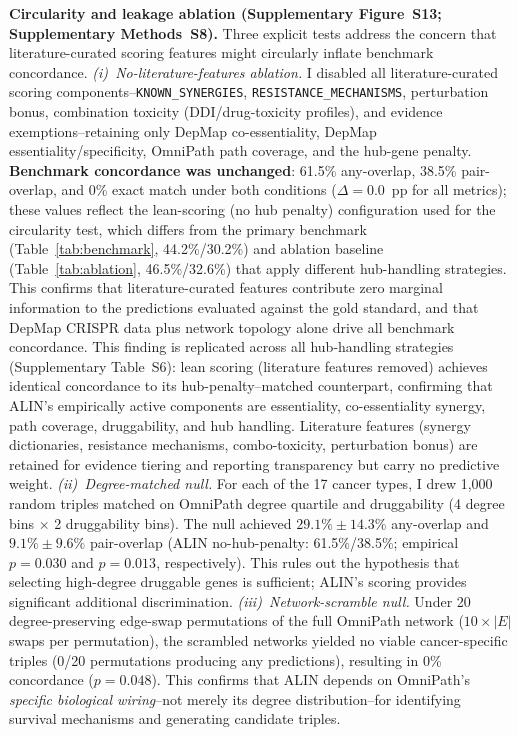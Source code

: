\documentclass[times, twoside, watermark]{zHenriquesLab-StyleBioRxiv}
\begin{document}
\textbf{Circularity and leakage ablation (Supplementary Figure~S13; Supplementary Methods~S8).}
Three explicit tests address the concern that literature-curated scoring features might circularly inflate benchmark concordance.
\emph{(i)~No-literature-features ablation.} I disabled all literature-curated scoring components--\texttt{KNOWN\_SYNERGIES}, \texttt{RESISTANCE\_MECHANISMS}, perturbation bonus, combination toxicity (DDI/drug-toxicity profiles), and evidence exemptions--retaining only DepMap co-essentiality, DepMap essentiality/specificity, OmniPath path coverage, and the hub-gene penalty. \textbf{Benchmark concordance was unchanged}: 61.5\% any-overlap, 38.5\% pair-overlap, and 0\% exact match under both conditions ($\Delta = 0.0$~pp for all metrics); these values reflect the lean-scoring (no hub penalty) configuration used for the circularity test, which differs from the primary benchmark (Table~\ref{tab:benchmark}, 44.2\%/30.2\%) and ablation baseline (Table~\ref{tab:ablation}, 46.5\%/32.6\%) that apply different hub-handling strategies. This confirms that literature-curated features contribute zero marginal information to the predictions evaluated against the gold standard, and that DepMap CRISPR data plus network topology alone drive all benchmark concordance. This finding is replicated across all hub-handling strategies (Supplementary Table~S6): lean scoring (literature features removed) achieves identical concordance to its hub-penalty--matched counterpart, confirming that ALIN's empirically active components are essentiality, co-essentiality synergy, path coverage, druggability, and hub handling. Literature features (synergy dictionaries, resistance mechanisms, combo-toxicity, perturbation bonus) are retained for evidence tiering and reporting transparency but carry no predictive weight.
\emph{(ii)~Degree-matched null.} For each of the 17 cancer types, I drew 1{,}000 random triples matched on OmniPath degree quartile and druggability (4 degree bins $\times$ 2 druggability bins). The null achieved $29.1\% \pm 14.3\%$ any-overlap and $9.1\% \pm 9.6\%$ pair-overlap (ALIN no-hub-penalty: 61.5\%/38.5\%; empirical $p = 0.030$ and $p = 0.013$, respectively). This rules out the hypothesis that selecting high-degree druggable genes is sufficient; ALIN's scoring provides significant additional discrimination.
\emph{(iii)~Network-scramble null.} Under 20 degree-preserving edge-swap permutations of the full OmniPath network ($10\times|E|$ swaps per permutation), the scrambled networks yielded no viable cancer-specific triples (0/20 permutations producing any predictions), resulting in 0\% concordance ($p = 0.048$). This confirms that ALIN depends on OmniPath's \emph{specific biological wiring}--not merely its degree distribution--for identifying survival mechanisms and generating candidate triples.
\end{document}
